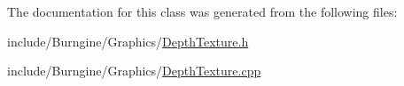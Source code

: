 The documentation for this class was generated from the following files\-:\begin{DoxyCompactItemize}
\item 
include/\-Burngine/\-Graphics/\hyperlink{_depth_texture_8h}{Depth\-Texture.\-h}\item 
include/\-Burngine/\-Graphics/\hyperlink{_depth_texture_8cpp}{Depth\-Texture.\-cpp}\end{DoxyCompactItemize}
